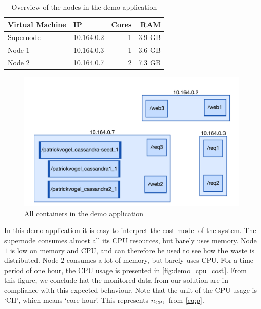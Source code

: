 \begin{table}
    \centering
    \begin{tabular}{l|lrr}
        Virtual Machine &IP & Cores & RAM \\ \hline
        Supernode & 10.164.0.2 & 1 & 3.9 GB \\
        Node $1$ & 10.164.0.3 & 1 & 3.6 GB \\
        Node $2$ & 10.164.0.7 & 2 & 7.3 GB \\
    \end{tabular}
    \caption{Overview of the nodes in the demo application}
    \label{tab:node_stats}
\end{table}

\begin{figure}
    \centering
    \includegraphics[width=\textwidth]{gfx/demo_app}
    \caption{All containers in the demo application}
    \label{fig:demo_app}
\end{figure}

\noindent
In this demo application it is easy to interpret the cost model of the system. The supernode consumes almost all its CPU resources, but barely uses memory. Node $1$ is low on memory and CPU, and can therefore be used to see how the waste is distributed. Node $2$ consumes a lot of memory, but barely uses CPU. For a time period of one hour, the CPU usage is presented in \autoref{fig:demo_cpu_cost}. From this figure, we conclude hat the monitored data from our solution are in compliance with this expected behaviour. Note that the unit of the CPU usage is `CH', which means `core hour'. This represents $n_\text{CPU}$ from \autoref{eq:p}.\\


